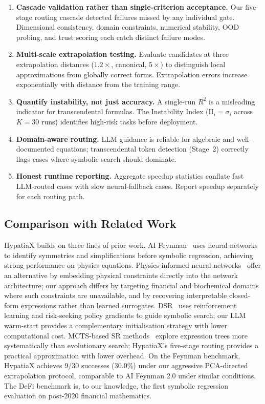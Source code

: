 \documentclass[twoside,11pt]{article}
\newcommand{\Rsq}{R^{2}}
\newcommand{\II}{\mathrm{II}}
\begin{document}
\begin{enumerate}
  \item \textbf{Cascade validation rather than single-criterion acceptance.} Our five-stage routing cascade detected failures missed by any individual gate. Dimensional consistency, domain constraints, numerical stability, OOD probing, and trust scoring each catch distinct failure modes.
  \item \textbf{Multi-scale extrapolation testing.} Evaluate candidates at three extrapolation distances ($1.2\times$, canonical, $5\times$) to distinguish local approximations from globally correct forms. Extrapolation errors increase exponentially with distance from the training range.
  \item \textbf{Quantify instability, not just accuracy.} A single-run $\Rsq$ is a misleading indicator for transcendental formulas. The Instability Index ($\II_i = \sigma_i$ across $K=30$ runs) identifies high-risk tasks before deployment.
  \item \textbf{Domain-aware routing.} LLM guidance is reliable for algebraic and well-documented equations; transcendental token detection (Stage~2) correctly flags cases where symbolic search should dominate.
  \item \textbf{Honest runtime reporting.} Aggregate speedup statistics conflate fast LLM-routed cases with slow neural-fallback cases. Report speedup separately for each routing path.
\end{enumerate}

\subsection{Comparison with Related Work}
\label{sec:disc_related}

HypatiaX builds on three lines of prior work. AI Feynman~\citep{udrescu2020ai} uses neural networks to identify symmetries and simplifications before symbolic regression, achieving strong performance on physics equations. Physics-informed neural networks~\citep{raissi2019physics,karniadakis2021physics} offer an alternative by embedding physical constraints directly into the network architecture; our approach differs by targeting financial and biochemical domains where such constraints are unavailable, and by recovering interpretable closed-form expressions rather than learned surrogates. DSR~\citep{petersen2021deep,landajuela2022unified} uses reinforcement learning and risk-seeking policy gradients to guide symbolic search; our LLM warm-start provides a complementary initialisation strategy with lower computational cost. MCTS-based SR methods~\citep{sun2022symbolic} explore expression trees more systematically than evolutionary search; HypatiaX's five-stage routing provides a practical approximation with lower overhead. On the Feynman benchmark, HypatiaX achieves 9/30 successes (30.0\%) under our aggressive PCA-directed extrapolation protocol, comparable to AI Feynman 2.0 under similar conditions. The DeFi benchmark is, to our knowledge, the first symbolic regression evaluation on post-2020 financial mathematics.
\end{document}
